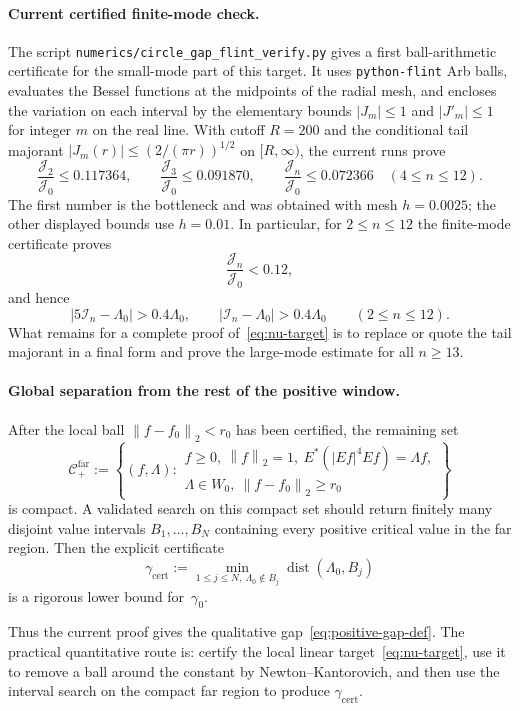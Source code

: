 \documentclass[12pt]{article}
\theoremstyle{definition}
\theoremstyle{remark}
\newcommand{\abs}[1]{\left|#1\right|}
\newcommand{\norm}[1]{\left\|#1\right\|}
\begin{document}
\paragraph{Current certified finite-mode check.}
The script \texttt{numerics/circle\_gap\_flint\_verify.py} gives a first
ball-arithmetic certificate for the small-mode part of this target.  It uses
\texttt{python-flint} Arb balls, evaluates the Bessel functions at the
midpoints of the radial mesh, and encloses the variation on each interval by
the elementary bounds $\abs{J_m}\leq1$ and $\abs{J'_m}\leq1$ for integer
$m$ on the real line.  With cutoff $R=200$ and the conditional tail majorant
$\abs{J_m(r)}\leq (2/(\pi r))^{1/2}$ on $[R,\infty)$, the current runs prove
\[
  \frac{\mathcal J_2}{\mathcal J_0}\leq 0.117364,\qquad
  \frac{\mathcal J_3}{\mathcal J_0}\leq 0.091870,\qquad
  \frac{\mathcal J_n}{\mathcal J_0}\leq 0.072366
  \quad (4\leq n\leq12).
\]
The first number is the bottleneck and was obtained with mesh
$h=0.0025$; the other displayed bounds use $h=0.01$.  In particular, for
$2\leq n\leq12$ the finite-mode certificate proves
\[
  \frac{\mathcal J_n}{\mathcal J_0}<0.12,
\]
and hence
\[
  \abs{5\mathcal I_n-\Lambda_0}>0.4\Lambda_0,\qquad
  \abs{\mathcal I_n-\Lambda_0}>0.4\Lambda_0
  \qquad (2\leq n\leq12).
\]
What remains for a complete proof of~\eqref{eq:nu-target} is to replace or
quote the tail majorant in a final form and prove the large-mode estimate
for all $n\geq13$.

\paragraph{Global separation from the rest of the positive window.}
After the local ball $\norm{f-f_0}_2<r_0$ has been certified, the remaining
set
\[
  \mathcal C_+^{\mathrm{far}}
  :=
  \left\{
    (f,\Lambda):
    \begin{array}{l}
      f\geq0,\ \norm{f}_2=1,\ E^*(|Ef|^4Ef)=\Lambda f,\\
      \Lambda\in W_0,\ \norm{f-f_0}_2\geq r_0
    \end{array}
  \right\}
\]
is compact.  A validated search on this compact set should return finitely
many disjoint value intervals $B_1,\ldots,B_N$ containing every positive
critical value in the far region.  Then the explicit certificate
\[
  \gamma_{\mathrm{cert}}
  :=
  \min_{1\leq j\leq N,\ \Lambda_0\notin B_j}
  \operatorname{dist}(\Lambda_0,B_j)
\]
is a rigorous lower bound for~$\gamma_0$.

Thus the current proof gives the qualitative gap~\eqref{eq:positive-gap-def}.
The practical quantitative route is: certify the local linear
target~\eqref{eq:nu-target}, use it to remove a ball around the constant
by Newton--Kantorovich, and then use the interval search on the compact
far region to produce $\gamma_{\mathrm{cert}}$.
\end{document}
